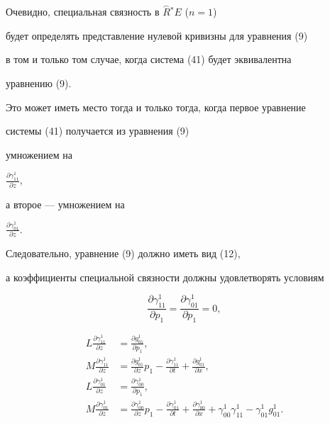 Очевидно, специальная связность в $\overset{\frown}{R}{}^*E$ (${n=1}$) 


будет определять представление нулевой кривизны для уравнения (9)


в том и только том случае, когда система (41) будет эквивалентна


уравнению (9).





Это может иметь место тогда и только тогда, когда первое уравнение


системы (41) получается из уравнения (9)


умножением на


$\frac{{\partial \gamma_{11}^1}}{{\partial z}}$,


а второе --- умножением на


$\frac{{\partial \gamma_{01}^1}}{{\partial z}}$. 


Следовательно, уравнение (9) должно иметь вид (12), 


а коэффициенты специальной связности должны удовлетворять условиям


\begin{equation}


\frac{{\partial \gamma_{11}^1}}{{\partial p_1}}=


\frac{{\partial \gamma_{01}^1}}{{\partial p_1}}=0,\tag{42.1}


\end{equation}


\begin{equation}


\begin{split}


L \frac{{\partial \gamma_{11}^1}}{{\partial z}}&=


\frac{{\partial g_{01}^1}}{{\partial p_1}},\\


M \frac{{\partial \gamma_{11}^1}}{{\partial z}}&=


\frac{{\partial g_{01}^1}}{{\partial z}} p_1-


\frac{{\partial \gamma_{11}^1}}{{\partial t}}+


\frac{{\partial g_{01}^1}}{{\partial x}},\\


L \frac{{\partial \gamma_{01}^1}}{{\partial z}}&=


\frac{{\partial \gamma_{00}^1}}{{\partial p_1}},\\


M \frac{{\partial \gamma_{01}^1}}{{\partial z}}&=


\frac{{\partial \gamma_{00}^1}}{{\partial z}} p_1-


\frac{{\partial \gamma_{01}^1}}{{\partial t}}+


\frac{{\partial \gamma_{00}^1}}{{\partial x}}+\gamma_{00}^1


\gamma_{11}^1-\gamma_{01}^1 g_{01}^1.


\end{split}


\tag{42.2}


\end{equation}


